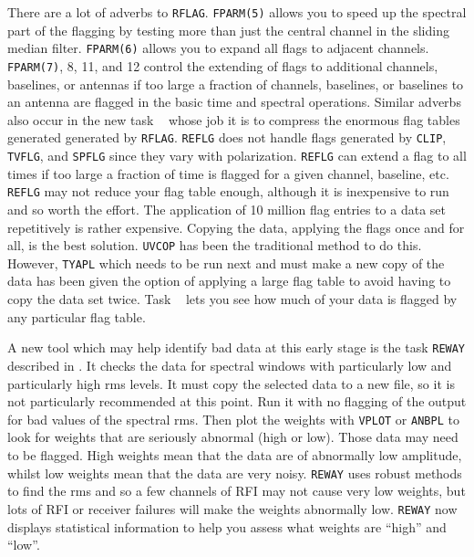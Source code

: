 There are a lot of adverbs to {\tt RFLAG}\@.  {\tt FPARM(5)} allows
you to speed up the spectral part of the flagging by testing more than
just the central channel in the sliding median filter.  {\tt FPARM(6)}
allows you to expand all flags to adjacent channels.  {\tt FPARM(7)},
8, 11, and 12 control the extending of flags to additional channels,
baselines, or antennas if too large a fraction of channels, baselines,
or baselines to an antenna are flagged in the basic time and spectral
operations.  Similar adverbs also occur in the new task {\tt
{}} whose job it is to compress the enormous flag tables
generated generated by {\tt RFLAG}\@.  {\tt REFLG} does not handle
flags generated by {\tt CLIP}, {\tt TVFLG}, and {\tt SPFLG} since they
vary with polarization.  {\tt REFLG} can extend a flag to all times if
too large a fraction of time is flagged for a given channel, baseline,
etc.  {\tt REFLG} may not reduce your flag table enough, although it
is inexpensive to run and so worth the effort.  The application of 10
million flag entries to a data set repetitively is rather expensive.
Copying the data, applying the flags once and for all, is the best
solution.  {\tt UVCOP} has been the traditional method to do this.
However, {\tt TYAPL} which needs to be run next and must make a new
copy of the data has been given the option of applying a large flag
table to avoid having to copy the data set twice.  Task {\tt
{}} lets you see how much of your data is flagged by any
particular flag table.

A new tool which may help identify bad data at this early stage is the
task {\tt REWAY} described in .  It checks the data for
spectral windows with particularly low and particularly high rms
levels.  It must copy the selected data to a new file, so it is not
particularly recommended at this point.  Run it with no flagging of
the output for bad values of the spectral rms.  Then plot the weights
with {\tt VPLOT} or {\tt ANBPL} to look for weights that are seriously
abnormal (high or low).  Those data may need to be flagged.  High
weights mean that the data are of abnormally low amplitude, whilst low
weights mean that the data are very noisy.  {\tt REWAY} uses robust
methods to find the rms and so a few channels of RFI may not cause
very low weights, but lots of RFI or receiver failures will make the
weights abnormally low.  {\tt REWAY} now displays statistical
information to help you assess what weights are ``high'' and ``low''.


